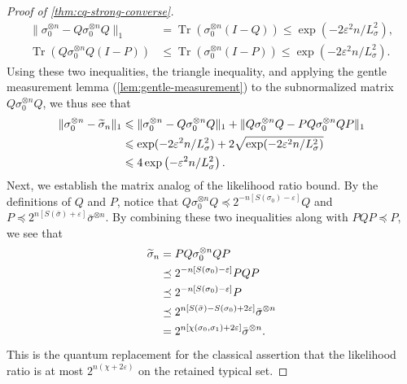 \documentclass[11pt]{article}
\renewcommand{\leq}{\leqslant}
\theoremstyle{remark}
\newcommand{\Tr}{\operatorname{Tr}}
\newcommand{\eps}{\varepsilon}
\newcommand{\norm}[1]{\lVert#1\rVert}
\begin{document}
\begin{proof}[Proof of \cref{thm:cq-strong-converse}]
\begin{align*}
\norm{\sigma_0^{\otimes n}-Q\sigma_0^{\otimes n}Q}_1
&= \Tr\left(\sigma_0^{\otimes n}(I-Q)\right)
\leq \exp(-2\eps^2n/L_\sigma^2), \\
\Tr\left(Q\sigma_0^{\otimes n}Q(I-P)\right)
&\leq \Tr\left(\sigma_0^{\otimes n}(I-P)\right)
\leq \exp(-2\eps^2n/L_\sigma^2).
\end{align*}
Using these two inequalities, the triangle inequality, and applying the gentle measurement lemma (\cref{lem:gentle-measurement}) to the subnormalized matrix $Q\sigma_0^{\otimes n}Q$, we thus see that
\begin{align}
\norm{\sigma_0^{\otimes n}-\widetilde{\sigma}_n}_1
&\leq \norm{\sigma_0^{\otimes n}-Q\sigma_0^{\otimes n}Q}_1+\norm{Q\sigma_0^{\otimes n}Q-PQ\sigma_0^{\otimes n}QP}_1 \notag \\
&\leq \exp(-2\eps^2n/L_\sigma^2)+2\sqrt{\exp(-2\eps^2n/L_\sigma^2)} \notag \\
&\leq 4\exp\left(-\eps^2n/L_\sigma^2\right).
\label{eq:spectral-truncation-distance}
\end{align}
Next, we establish the matrix analog of the likelihood ratio bound. By the definitions of $Q$ and $P$, notice that $Q\sigma_0^{\otimes n}Q \preceq 2^{-n[S(\sigma_0)-\eps]}Q$ and $P \preceq 2^{n[S(\bar{\sigma})+\eps]}\bar{\sigma}^{\otimes n}$. By combining these two inequalities along with $PQP \preceq P$, we see that
\begin{align}
\widetilde{\sigma}_n 
&= PQ\sigma_0^{\otimes n}QP \notag \\
&\preceq 2^{-n[S(\sigma_0)-\eps]}PQP \notag \\
&\preceq 2^{-n[S(\sigma_0)-\eps]}P \notag \\
&\preceq 2^{n[S(\bar{\sigma})-S(\sigma_0)+2\eps]}\bar{\sigma}^{\otimes n} \notag \\
&= 2^{n[\chi(\sigma_0,\sigma_1)+2\eps]}\bar{\sigma}^{\otimes n}.
\label{eq:spectral-truncation-domination}
\end{align}
This is the quantum replacement for the classical assertion that the likelihood ratio is at most $2^{n(\chi+2\eps)}$ on the retained typical set.


\end{proof}
\end{document}
